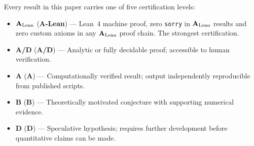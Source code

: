 \documentclass[11pt]{article}
\theoremstyle{remark}
\newcommand{\CatA}{\textbf{A}}
\newcommand{\CatAL}{\ensuremath{\textbf{A}_{\rm Lean}}}
\newcommand{\CatAD}{\textbf{A/D}}
\newcommand{\CatB}{\textbf{B}}
\newcommand{\CatD}{\textbf{D}}
\begin{document}
\clearpage
\begin{tcolorbox}[
  colback=gray!8,colframe=gray!50,title=Claim-Strength Taxonomy,
  fonttitle=\bfseries,breakable]
\small
\label{page:taxonomy}%
Every result in this paper carries one of five certification levels:
\begin{itemize}[leftmargin=1.8em,itemsep=2pt,topsep=2pt]
  \item \CatAL{} (\textbf{A-Lean}) --- Lean~4 machine proof, zero \texttt{sorry}
        in \CatAL{} results and zero custom axioms in any \CatAL{} proof chain.
        The strongest certification.
  \item \CatAD{} (\textbf{A/D}) --- Analytic or fully decidable proof;
        accessible to human verification.
  \item \CatA{} (\textbf{A}) --- Computationally verified result; output
        independently reproducible from published scripts.
  \item \CatB{} (\textbf{B}) --- Theoretically motivated conjecture with
        supporting numerical evidence.
  \item \CatD{} (\textbf{D}) --- Speculative hypothesis; requires further
        development before quantitative claims can be made.
\end{itemize}
\end{tcolorbox}
\end{document}
